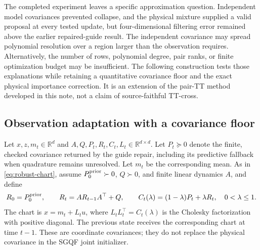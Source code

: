 \documentclass[11pt]{article}
\begin{document}
The completed experiment leaves a specific approximation question. Independent
model covariances prevented collapse, and the physical mixture supplied a
valid proposal at every tested update, but four-dimensional filtering error
remained above the earlier repaired-guide result. The independent covariance
may spread polynomial resolution over a region larger than the observation
requires. Alternatively, the number of rows, polynomial degree, pair ranks,
or finite optimization budget may be insufficient. The following construction
tests those explanations while retaining a quantitative covariance floor and
the exact physical importance correction. It is an extension of the pair-TT
method developed in this note, not a claim of source-faithful TT-cross.

\subsection{Observation adaptation with a covariance floor}

Let $x,z,m_t\in\mathbb R^d$ and $A,Q,P_t,R_t,C_t,L_t\in\mathbb R^{d\times d}$.
Let $P_t\succeq0$ denote the finite, checked covariance returned by the guide
repair, including its predictive fallback when quadrature remains unresolved.
Let $m_t$ be the corresponding mean. As in
\eqref{eq:robust-chart}, assume $P_0^{\rm prior}\succ0$, $Q\succ0$, and
finite linear dynamics $A$, and define
\begin{equation}
 R_0=P_0^{\rm prior},\qquad R_t=AR_{t-1}A^\top+Q,\qquad
 C_t(\lambda)=(1-\lambda)P_t+\lambda R_t,
 \quad 0<\lambda\le1.
 \label{eq:a11-blend}
\end{equation}
The chart is $x=m_t+L_tu$, where $L_tL_t^\top=C_t(\lambda)$ is the
Cholesky factorization with positive diagonal. The previous state receives
the corresponding chart at time $t-1$. These are coordinate covariances;
they do not replace the physical covariance in the SGQF joint initializer.
\end{document}
